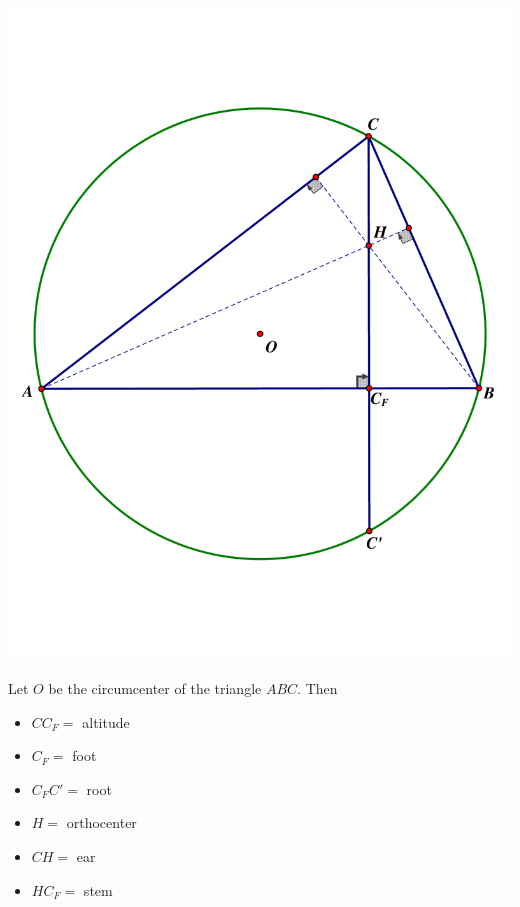 \documentclass{amsart}
\theoremstyle{definition}
\begin{document}
\begin{center}
\includegraphics[scale=.4]{Anatomy-of-Altitude.pdf}
\end{center}

Let $O$ be the circumcenter of the triangle $ABC$. Then
\begin{multicols}{3}
\begin{itemize}
\item[] $CC_F = $ altitude
\item[] $C_F = $ foot
\end{itemize}
\begin{itemize}
\item[] $C_FC' = $ root
\item[] $H = $ orthocenter
\end{itemize}
\begin{itemize}
\item[] $CH = $ ear
\item[] $HC_F = $ stem
\end{itemize}
\end{multicols}
\end{document}
